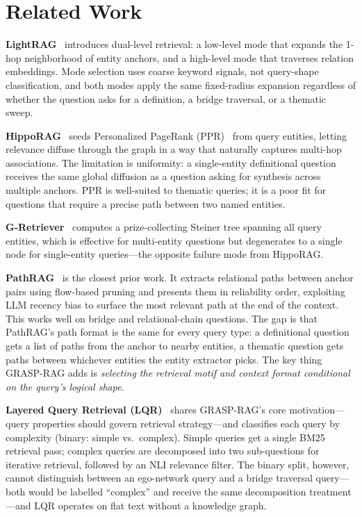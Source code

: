 \section{Related Work}
\label{sec:related}

\textbf{LightRAG}~\cite{guo2024lightrag} introduces dual-level retrieval:
a low-level mode that expands the 1-hop neighborhood of entity anchors, and
a high-level mode that traverses relation embeddings.
Mode selection uses coarse keyword signals, not query-shape classification,
and both modes apply the same fixed-radius expansion regardless of whether
the question asks for a definition, a bridge traversal, or a thematic sweep.

\textbf{HippoRAG}~\cite{gutierrez2024hipporag} seeds Personalized PageRank
(PPR)~\cite{page1999pagerank} from query entities, letting relevance diffuse
through the graph in a way that naturally captures multi-hop associations.
The limitation is uniformity: a single-entity definitional question receives
the same global diffusion as a question asking for synthesis across multiple
anchors.
PPR is well-suited to thematic queries; it is a poor fit for questions that
require a precise path between two named entities.

\textbf{G-Retriever}~\cite{he2024g} computes a prize-collecting Steiner tree
spanning all query entities, which is effective for multi-entity questions
but degenerates to a single node for single-entity queries---the opposite
failure mode from HippoRAG.

\textbf{PathRAG}~\cite{chen2025pathrag} is the closest prior work.
It extracts relational paths between anchor pairs using flow-based pruning
and presents them in reliability order, exploiting LLM recency bias to
surface the most relevant path at the end of the context.
This works well on bridge and relational-chain questions.
The gap is that PathRAG's path format is the same for every query type: a
definitional question gets a list of paths from the anchor to nearby
entities, a thematic question gets paths between whichever entities the
entity extractor picks.
The key thing GRASP-RAG adds is \emph{selecting the retrieval motif and
context format conditional on the query's logical shape}.

\textbf{Layered Query Retrieval (LQR)}~\cite{huang2024layered} shares
GRASP-RAG's core motivation---query properties should govern retrieval
strategy---and classifies each query by complexity (binary: simple vs.\
complex).
Simple queries get a single BM25 retrieval pass; complex queries are
decomposed into two sub-questions for iterative retrieval, followed by an
NLI relevance filter.
The binary split, however, cannot distinguish between an ego-network query
and a bridge traversal query---both would be labelled ``complex'' and receive
the same decomposition treatment---and LQR operates on flat text without a
knowledge graph.

